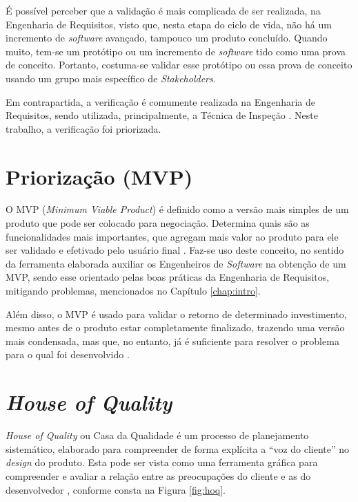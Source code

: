 É possível perceber que a validação é mais complicada de ser realizada, na Engenharia de Requisitos, visto que, nesta etapa do ciclo de vida, não há um incremento de \textit{software} avançado, tampouco um produto concluído. Quando muito, tem-se um protótipo ou um incremento de \textit{software} tido como uma prova de conceito. Portanto, costuma-se validar esse protótipo ou essa prova de conceito usando um grupo mais específico de \textit{Stakeholders}.

Em contrapartida, a verificação é comumente realizada na Engenharia de Requisitos, sendo utilizada, principalmente, a Técnica de Inspeção \cite{design_fagan} \cite{verification_MR}. Neste trabalho, a verificação foi priorizada.

\section{Priorização (MVP)}

\label{sec:priorizacao}

O MVP (\textit{Minimum Viable Product}) é definido como a versão mais simples de um produto que pode ser colocado para negociação. Determina quais são as funcionalidades mais importantes, que agregam mais valor ao produto para ele ser validado e efetivado pelo usuário final \cite{carolipaulo2018}. Faz-se uso deste conceito, no sentido da ferramenta elaborada auxiliar os Engenheiros de \textit{Software} na obtenção de um MVP, sendo esse orientado pelas boas práticas da Engenharia de Requisitos, mitigando problemas, mencionados no Capítulo \ref{chap:intro}.

Além disso, o MVP é usado para validar o retorno de determinado investimento, mesmo antes de o produto estar completamente finalizado, trazendo uma versão mais condensada, mas que, no entanto, já é suficiente para resolver o problema para o qual foi desenvolvido \cite{mvp}.

\section{\textit{House of Quality}}

\label{sec:house_of_quality}

\textit{House of Quality} ou Casa da Qualidade é um processo de planejamento sistemático, elaborado para compreender de forma explícita a “voz do cliente” no \textit{design} do produto. Esta pode ser vista como uma ferramenta gráfica para compreender e avaliar a relação entre as preocupações do cliente e as do desenvolvedor \cite{Howard_1}, conforme consta na Figura \ref{fig:hoq}.

